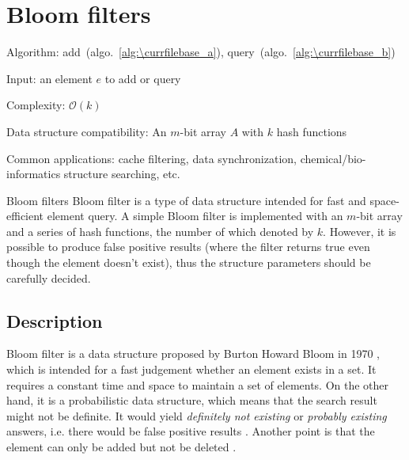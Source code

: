 \documentclass[catalog.tex]{subfiles}
\begin{document}
\def\pbname{Bloom filters} %

\section{\pbname} 

\begin{overview}
\item [Algorithm:] add~(algo.~\ref{alg:\currfilebase_a}), query~(algo.~\ref{alg:\currfilebase_b})
\item [Input:] an element $e$ to add or query
\item [Complexity:] $\mathcal{O}(k)$
\item [Data structure compatibility:] An $m$-bit array $A$ with $k$ hash functions
\item [Common applications:] cache filtering, data synchronization, chemical/bio-informatics structure searching, etc.
\end{overview}


\begin{problem}{\pbname}
	Bloom filter is a type of data structure intended for fast and space-efficient element query. A simple Bloom filter is implemented with an $m$-bit array and a series of hash functions, the number of which denoted by $k$. However, it is possible to produce false positive results (where the filter returns true even though the element doesn't exist), thus the structure parameters should be carefully decided.
\end{problem}


\subsection*{Description}

Bloom filter is a data structure proposed by Burton Howard Bloom in 1970 \cite{bloom1970space}, which is intended for a fast judgement whether an element exists in a set. It requires a constant time and space to maintain a set of elements. On the other hand, it is a probabilistic data structure, which means that the search result might not be definite. It would yield \textit{definitely not existing} or \textit{probably existing} answers, i.e. there would be false positive results \cite{nilsson}. Another point is that the element can only be added but not be deleted \cite{nilsson}.
\end{document}
